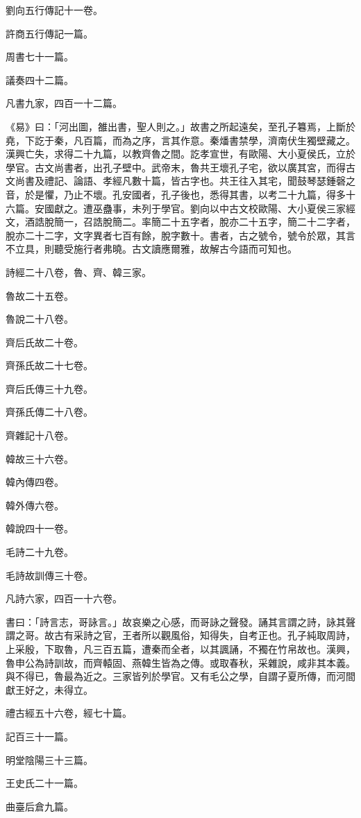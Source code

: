 \begin{pinyinscope}
劉向五行傳記十一卷。

許商五行傳記一篇。

周書七十一篇。

議奏四十二篇。

凡書九家，四百一十二篇。

《易》曰：「河出圖，雒出書，聖人則之。」故書之所起遠矣，至孔子篹焉，上斷於堯，下訖于秦，凡百篇，而為之序，言其作意。秦燔書禁學，濟南伏生獨壁藏之。漢興亡失，求得二十九篇，以教齊魯之間。訖孝宣世，有歐陽、大小夏侯氏，立於學官。古文尚書者，出孔子壁中。武帝末，魯共王壞孔子宅，欲以廣其宮，而得古文尚書及禮記、論語、孝經凡數十篇，皆古字也。共王往入其宅，聞鼓琴瑟鍾磬之音，於是懼，乃止不壞。孔安國者，孔子後也，悉得其書，以考二十九篇，得多十六篇。安國獻之。遭巫蠱事，未列于學官。劉向以中古文校歐陽、大小夏侯三家經文，酒誥脫簡一，召誥脫簡二。率簡二十五字者，脫亦二十五字，簡二十二字者，脫亦二十二字，文字異者七百有餘，脫字數十。書者，古之號令，號令於眾，其言不立具，則聽受施行者弗曉。古文讀應爾雅，故解古今語而可知也。

詩經二十八卷，魯、齊、韓三家。

魯故二十五卷。

魯說二十八卷。

齊后氏故二十卷。

齊孫氏故二十七卷。

齊后氏傳三十九卷。

齊孫氏傳二十八卷。

齊雜記十八卷。

韓故三十六卷。

韓內傳四卷。

韓外傳六卷。

韓說四十一卷。

毛詩二十九卷。

毛詩故訓傳三十卷。

凡詩六家，四百一十六卷。

書曰：「詩言志，哥詠言。」故哀樂之心感，而哥詠之聲發。誦其言謂之詩，詠其聲謂之哥。故古有采詩之官，王者所以觀風俗，知得失，自考正也。孔子純取周詩，上采殷，下取魯，凡三百五篇，遭秦而全者，以其諷誦，不獨在竹帛故也。漢興，魯申公為詩訓故，而齊轅固、燕韓生皆為之傳。或取春秋，采雜說，咸非其本義。與不得已，魯最為近之。三家皆列於學官。又有毛公之學，自謂子夏所傳，而河間獻王好之，未得立。

禮古經五十六卷，經七十篇。

記百三十一篇。

明堂陰陽三十三篇。

王史氏二十一篇。

曲臺后倉九篇。


\end{pinyinscope}
